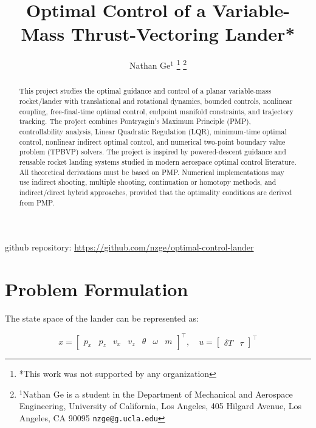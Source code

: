 \documentclass[letterpaper, 10 pt, conference]{ieeeconf}
\title{\LARGE \bf Optimal Control of a Variable-Mass Thrust-Vectoring Lander*}
\author{Nathan Ge$^{1}$%
\thanks{*This work was not supported by any organization}%
\thanks{$^{1}$Nathan Ge is a student in the Department of Mechanical and Aerospace Engineering,
        University of California, Los Angeles, 405 Hilgard Avenue, Los Angeles, CA 90095
        {\tt\small nzge@g.ucla.edu}} }
\begin{document}
\maketitle
\thispagestyle{empty}
\pagestyle{empty}

\begin{abstract}
This project studies the optimal guidance and control of a planar variable-mass rocket/lander with translational and rotational dynamics, bounded controls, nonlinear coupling, free-final-time optimal control, endpoint manifold constraints, and trajectory tracking. The project combines Pontryagin’s Maximum Principle (PMP), controllability analysis, Linear Quadratic Regulation (LQR), minimum-time optimal control, nonlinear indirect optimal control, and numerical two-point boundary value problem (TPBVP) solvers. The project is inspired by powered-descent guidance and reusable rocket landing systems studied in modern aerospace optimal control literature. All theoretical derivations must be based on PMP. Numerical implementations may use indirect shooting, multiple shooting, continuation or homotopy methods, and indirect/direct hybrid approaches, provided that the optimality conditions are derived from PMP.
\end{abstract}

github repository: \href{link}{https://github.com/nzge/optimal-control-lander}

\section{Problem Formulation}

The state space of the lander can be represented as: 

\[
x = \begin{bmatrix} p_x & p_z & v_x & v_z & \theta & \omega & m \end{bmatrix}^\top, \quad u = \begin{bmatrix} \delta T & \tau \end{bmatrix}^\top
\]
\end{document}
